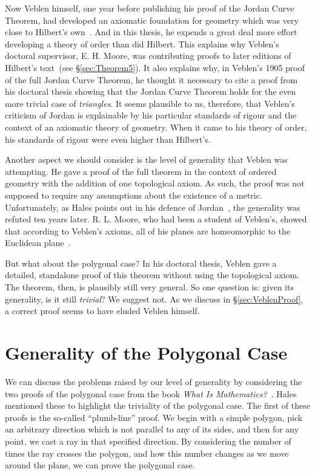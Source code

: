 Now Veblen himself, one year before publishing his proof of the Jordan Curve Theorem, had developed an axiomatic foundation for geometry which was very close to Hilbert's own~\cite{Veblenphd}. And in this thesis, he expends a great deal more effort developing a theory of order than did Hilbert. This explains why Veblen's doctoral supervisor, E. H. Moore, was contributing proofs to later editions of Hilbert's text~(see \S\ref{sec:Theorem5}). It also explains why, in Veblen's 1905 proof of the full Jordan Curve Theorem, he thought it necessary to cite a proof from his doctoral thesis showing that the Jordan Curve Theorem holds for the even more trivial case of \emph{triangles}. It seems plausible to us, therefore, that Veblen's criticism of Jordan is explainable by his particular standards of rigour and the context of an axiomatic theory of geometry. When it came to his theory of order, his standards of rigour were even higher than Hilbert's.

Another aspect we should consider is the level of generality that Veblen was attempting. He gave a proof of the full theorem in the context of ordered geometry with the addition of one topological axiom. As such, the proof was not supposed to require any assumptions about the existence of a metric. Unfortunately, as Hales points out in his defence of Jordan~\cite{HalesJordansProof}, the generality was refuted ten years later. R. L. Moore, who had been a student of Veblen's, showed that according to Veblen's axioms, all of his planes are homeomorphic to the Euclidean plane~\cite{MooreSitus}. %

But what about the polygonal case? In his doctoral thesis, Veblen gave a detailed, standalone proof of this theorem without using the topological axiom. The theorem, then, is plausibly still very general. So one question is: given its generality, is it still \emph{trivial}? We suggest not. As we discuss in \S\ref{sec:VeblenProof}, a correct proof seems to have eluded Veblen himself.

\section{Generality of the Polygonal Case}\label{sec:JordanCurveGenerality}
We can discuss the problems raised by our level of generality by considering the two proofs of the polygonal case from the book \emph{What Is Mathematics?}~\cite{WhatIsMathematics}. Hales mentioned these to highlight the triviality of the polygonal case. The first of these proofs is the so-called ``plumb-line'' proof. We begin with a simple polygon, pick an arbitrary direction which is not parallel to any of its sides, and then for any point, we cast a ray in that specified direction. By considering the number of times the ray crosses the polygon, and how this number changes as we move around the plane, we can prove the polygonal case.

